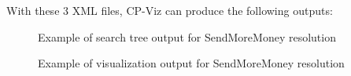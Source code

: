 With these 3 XML files, CP-Viz can produce the following outputs:

\begin{figure}[!htp]
	\centerline{}
	\caption[]{Example of search tree output for SendMoreMoney resolution}\label{fig:media/tree-SendMoreMoney2.pdf}
\end{figure}

\begin{figure}[!htp]
	\centerline{}
	\caption[]{Example of visualization output for SendMoreMoney resolution}\label{fig:media/visualization-SendMoreMoney4.pdf}
\end{figure}
